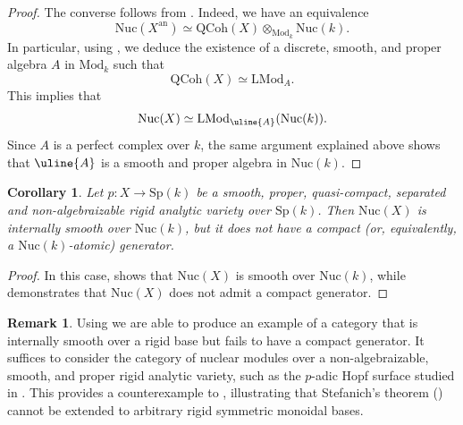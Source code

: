 \documentclass[oneside, hidelinks, 12pt, a4paper,reqno]{amsart}
\theoremstyle{plain}
\theoremstyle{definition}
\newtheorem{remark}[remark]{Remark}
\theoremstyle{plain}
\newtheorem{corollary}[corollary]{Corollary}
\newcommand{\Sp}{\mathrm{Sp}}
\newcommand{\Nuc}{\mathrm{Nuc}}
\newcommand{\Qcoh}{\mathrm{QCoh}}
\newcommand{\Mod}{\mathrm{Mod}}
\newcommand{\LMod}{\mathrm{LMod}}
\begin{document}
\begin{proof}
    The converse follows from . Indeed, we have an equivalence
    \[
    \Nuc(X^{\mathrm{an}})\simeq \Qcoh(X)\otimes_{\Mod_{k}}\Nuc(k).
    \]
    In particular, using , we deduce the existence of a discrete, smooth, and proper algebra $A$ in $\Mod_{k}$ such that
    \[
    \Qcoh(X) \simeq \LMod_{A}.
    \]
    This implies that 
    \[
    \Nuc(X) \simeq \LMod_{\uline{A}}(\Nuc(k)).
    \]
    Since $A$ is a perfect complex over $k$, the same argument explained above shows that $\uline{A}$ is a smooth and proper algebra in $\Nuc(k)$.
\end{proof}

\begin{corollary}\label{cor: counterxample}
    Let $p\colon X \to \Sp(k)$ be a smooth, proper, quasi-compact, separated and non-algebraizable rigid analytic variety over $\Sp(k)$. Then $\Nuc(X)$ is internally smooth over $\Nuc(k)$, but it does not have a compact (or, equivalently, a $\Nuc(k)$-atomic) generator. 
\end{corollary}

\begin{proof}
    In this case,  shows that $\Nuc(X)$ is smooth over $\Nuc(k)$, while  demonstrates that $\Nuc(X)$ does not admit a compact generator.
\end{proof}


\begin{remark}
     Using  we are able to produce an example of a category that is internally smooth over a rigid base but fails to have a compact generator. It suffices to consider the category of nuclear modules over a non-algebraizable, smooth, and proper rigid analytic variety, such as the $p$-adic Hopf surface studied in \cite{mustafin1977padic, voskuil1991nonarchimedean}.
     This provides a counterexample to , illustrating that Stefanich's theorem (\cite{stefanich2023classification}) cannot be extended to arbitrary rigid symmetric monoidal bases.
\end{remark}
\end{document}
